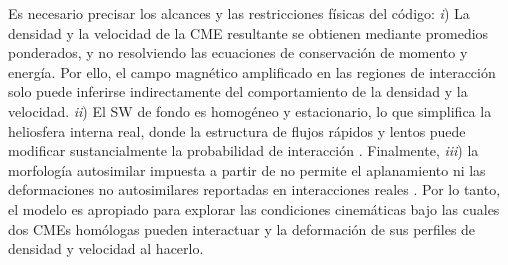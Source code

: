 Es necesario precisar los alcances y las restricciones físicas del código: \textit{i}) La densidad y la velocidad de la CME resultante se obtienen mediante promedios ponderados, y no resolviendo las ecuaciones de conservación de momento y energía. Por ello, el campo magnético amplificado en las regiones de interacción solo puede inferirse indirectamente del comportamiento de la densidad y la velocidad. \textit{ii}) El \ac{SW} de fondo es homogéneo y estacionario, lo que simplifica la heliosfera interna real, donde la estructura de flujos rápidos y lentos puede modificar sustancialmente la probabilidad de interacción \parencite[e.g.,][]{aschwanden-2019}. Finalmente, \textit{iii}) la morfología autosimilar impuesta a partir de \textcite[e.g.,][]{savani-2011} no permite el aplanamiento ni las deformaciones no autosimilares reportadas en interacciones reales \parencite[e.g.,][]{lugaz-2005,xiong-2006}. Por lo tanto, el modelo es apropiado para explorar las condiciones cinemáticas bajo las cuales dos CMEs homólogas pueden interactuar y la deformación de sus perfiles de densidad y velocidad al hacerlo.